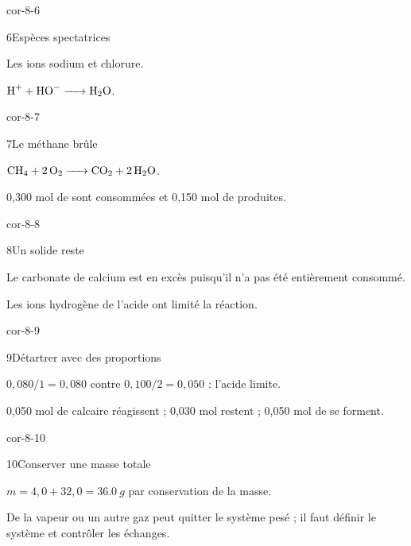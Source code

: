\begin{blocLivre}{cor-8-6}\begin{corrige}{6}{Espèces spectatrices}
\begin{questions}
\item Les ions sodium et chlorure.
\item $\ce{H+ + HO- -> H2O}$.
\end{questions}
\end{corrige}\end{blocLivre}
\begin{blocLivre}{cor-8-7}\begin{corrige}{7}{Le méthane brûle}
\begin{questions}
\item $\ce{CH4 + 2 O2 -> CO2 + 2 H2O}$.
\item 0,300 mol de  sont consommées et 0,150 mol de  produites.
\end{questions}
\end{corrige}\end{blocLivre}
\begin{blocLivre}{cor-8-8}\begin{corrige}{8}{Un solide reste}
\begin{questions}
\item Le carbonate de calcium est en excès puisqu’il n’a pas été entièrement consommé.
\item Les ions hydrogène de l’acide ont limité la réaction.
\end{questions}
\end{corrige}\end{blocLivre}
\begin{blocLivre}{cor-8-9}\begin{corrige}{9}{Détartrer avec des proportions}
\begin{questions}
\item $0,080/1=0,080$ contre $0,100/2=0,050$ : l’acide limite.
\item 0,050 mol de calcaire réagissent ; 0,030 mol restent ; 0,050 mol de  se forment.
\end{questions}
\end{corrige}\end{blocLivre}
\begin{blocLivre}{cor-8-10}\begin{corrige}{10}{Conserver une masse totale}
\begin{questions}
\item $m=4,0+32,0=\qty{36,0}{g}$ par conservation de la masse.
\item De la vapeur ou un autre gaz peut quitter le système pesé ; il faut définir le système et contrôler les échanges.
\end{questions}
\end{corrige}\end{blocLivre}
